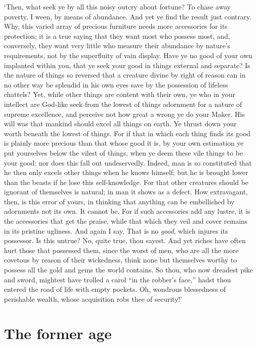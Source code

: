 \documentclass[11pt]{book}
\begin{document}
`Then, what seek ye by all this noisy outcry about fortune? To chase
away poverty, I ween, by means of abundance. And yet ye find the result
just contrary. Why, this varied array of precious furniture needs more
accessories for its protection; it is a true saying that they want most
who possess most, and, conversely, they want very little who measure
their abundance by nature's requirements, not by the superfluity of vain
display. Have ye no good of your own implanted within you, that ye seek
your good in things external and separate? Is the nature of things so
reversed that a creature divine by right of reason can in no other way
be splendid in his own eyes save by the possession of lifeless chattels?
Yet, while other things are content with their own, ye who in your
intellect are God-like seek from the lowest of things adornment for a
nature of supreme excellence, and perceive not how great a wrong ye do
your Maker. His will was that mankind should excel all things on earth.
Ye thrust down your worth beneath the lowest of things. For if that in
which each thing finds its good is plainly more precious than that whose
good it is, by your own estimation ye put yourselves below the vilest of
things, when ye deem these vile things to be your good: nor does this
fall out undeservedly. Indeed, man is so constituted that he then only
excels other things when he knows himself; but he is brought lower than
the beasts if he lose this self-knowledge. For that other creatures
should be ignorant of themselves is natural; in man it shows as a
defect. How extravagant, then, is this error of yours, in thinking that
anything can be embellished by adornments not its own. It cannot be. For
if such accessories add any lustre, it is the accessories that get the
praise, while that which they veil and cover remains in its pristine
ugliness. And again I say, That is no \emph{good}, which injures its
possessor. Is this untrue? No, quite true, thou sayest. And yet riches
have often hurt those that possessed them, since the worst of men, who
are all the more covetous by reason of their wickedness, think none but
themselves worthy to possess all the gold and gems the world contains.
So thou, who now dreadest pike and sword, mightest have trolled a carol
``in the robber's face,'' hadst thou entered the road of life with empty
pockets. Oh, wondrous blessedness of perishable wealth, whose
acquisition robs thee of security!'




\section{The former age}
\end{document}
